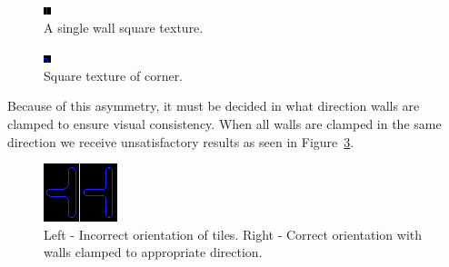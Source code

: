 \documentclass[a4paper,12pt]{article}
\begin{document}
\begin{figure}[H]
\centering
\includegraphics[width=0.4\linewidth]{Image-2.png}
\caption {A single wall square texture.}\label{StraightWallTexture}
\end{figure}

\begin{figure}[H]
\centering
\includegraphics[width=0.4\linewidth]{Image-3.png}
\caption {Square texture of corner.}\label{CornerTexture}
\end{figure}

Because of this asymmetry, it must be decided in what direction walls are clamped to ensure visual consistency. When all walls are clamped in the same direction we receive unsatisfactory results as seen in Figure~\ref{WallTextureAsymmetry}.

\begin{figure}[H]
\centering
\includegraphics[width=0.4\linewidth]{Image-4.png}
\caption {Left - Incorrect orientation of tiles. Right - Correct orientation with walls clamped to appropriate direction.}\label{WallTextureAsymmetry}
\end{figure}
\end{document}
